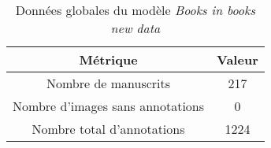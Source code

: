 \documentclass[12pt,twoside]{book}
\begin{document}
\begin{center}
\begin{table}[ht]
    \centering
    \caption{Données globales du modèle \textit{Books in books new data}}
    \begin{tabular}{|c|c|}
    \hline
    \textbf{Métrique} & \textbf{Valeur} \\
    \hline
    Nombre de manuscrits & 217 \\ 
    \hline
    Nombre d'images sans annotations & 0 \\ 
    \hline
    Nombre total d'annotations & 1224 \\ 
    \hline
    \end{tabular}
\end{table}    
\end{center}



\backmatter

\printindex
\cleardoublepage
{}
{}
\listoffigures


\cleardoublepage
{}
{}
\listoftables

\tableofcontents
\end{document}
